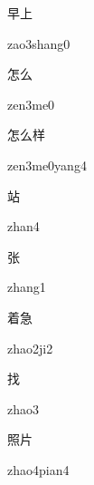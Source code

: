 \begin{multicols*}{2}
\begin{verbete}{早上}
\begin{pronuncia}{zao3shang0}
\end{pronuncia}
\end{verbete}

\begin{verbete}[zen3me0]{怎么}
\begin{pronuncia}{zen3me0}
\end{pronuncia}
\end{verbete}

\begin{verbete}{怎么样}
\begin{pronuncia}{zen3me0yang4}
\end{pronuncia}
\end{verbete}

\begin{verbete}[zhan4]{站}
\begin{pronuncia}{zhan4}
\end{pronuncia}
\end{verbete}

\begin{verbete}[zhang1]{张}
\begin{pronuncia}{zhang1}
\end{pronuncia}
\end{verbete}

\begin{verbete}[zhao2ji2]{着急}
\begin{pronuncia}{zhao2ji2}
\end{pronuncia}
\end{verbete}

\begin{verbete}[zhao3]{找}
\begin{pronuncia}{zhao3}
\end{pronuncia}
\end{verbete}

\begin{verbete}{照片}
\begin{pronuncia}{zhao4pian4}
\end{pronuncia}
\end{verbete}


\end{multicols*}
